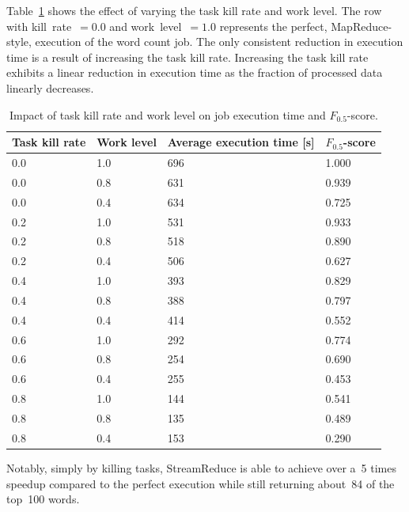 \documentclass[12pt,twocolumn]{article}
\begin{document}
Table~\ref{table:runtime} shows the effect of varying the task kill rate and work level. The
row
with kill~rate~$=0.0$ and work~level~$=1.0$ represents the perfect, MapReduce-style,
execution
of the word count job. The only consistent reduction in execution time is a result of
increasing the task kill rate. Increasing the task kill rate exhibits a linear reduction in
execution
time as the fraction of processed data linearly decreases.

\begin{table}
\begin{tabularx}{\linewidth}{|X|X|X|X|}
\hline
Task kill rate & Work level & Average execution time [s] & $F_{0.5}$-score \\ \hline\hline
0.0 & 1.0 & 696 & 1.000 \\ \hline
0.0 & 0.8 & 631 & 0.939 \\ \hline
0.0 & 0.4 & 634 & 0.725 \\ \hline\hline
0.2 & 1.0 & 531 & 0.933 \\ \hline
0.2 & 0.8 & 518 & 0.890 \\ \hline
0.2 & 0.4 & 506 & 0.627 \\ \hline\hline
0.4 & 1.0 & 393 & 0.829 \\ \hline
0.4 & 0.8 & 388 & 0.797 \\ \hline
0.4 & 0.4 & 414 & 0.552 \\ \hline\hline
0.6 & 1.0 & 292 & 0.774 \\ \hline
0.6 & 0.8 & 254 & 0.690 \\ \hline
0.6 & 0.4 & 255 & 0.453 \\ \hline\hline
0.8 & 1.0 & 144 & 0.541 \\ \hline
0.8 & 0.8 & 135 & 0.489 \\ \hline
0.8 & 0.4 & 153 & 0.290 \\ \hline
\end{tabularx}
\caption{Impact of task kill rate and work level on job execution time and $F_{0.5}$-score.}
\label{table:runtime}
\end{table}

Notably, simply by killing tasks, StreamReduce is able to achieve over a~5 times speedup
compared
to the perfect execution while still returning about~84 of the top~100 words.
\end{document}
